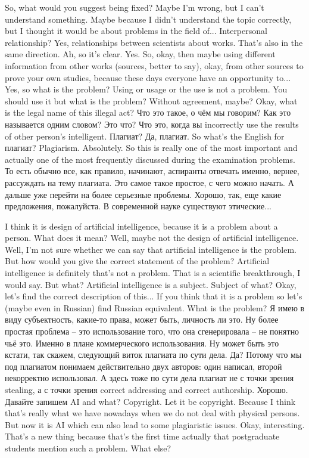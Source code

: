 \documentclass[main.tex]{subfiles}
\begin{document}
So, what would you suggest being fixed?
Maybe I'm wrong, but I can't understand something.
Maybe because I didn't understand the topic correctly, but I thought it would be about problems in the field of... Interpersonal relationship?
Yes, relationships between scientists about works.
That's also in the same direction.
Ah, so it's clear.
Yes.
So, okay, then maybe using different information from other works (sources, better to say), okay, from other sources to prove your own studies, because these days everyone have an opportunity to...
Yes, so what is the problem?
Using or usage or the use is not a problem.
You should use it but what is the problem?
Without agreement, maybe?
Okay, what is the legal name of this illegal act?
Что это такое, о чём мы говорим?
Как это называется одним словом?
Это что?
Что это, когда вы incorrectly use the results of other person's intelligent.
Плагиат?
Да, плагиат.
So what's the English for плагиат?
Plagiarism.
Absolutely.
So this is really one of the most important and actually one of the most frequently discussed during the examination problems.
То есть обычно все, как правило, начинают, аспиранты отвечать именно, вернее, рассуждать на тему плагиата.
Это самое такое простое, с чего можно начать.
А дальше уже перейти на более серьезные проблемы.
Хорошо, так, еще какие предложения, пожалуйста.
В современной науке существуют этические...

I think it is design of artificial intelligence, because it is a problem about a person.
What does it mean?
Well, maybe not the design of artificial intelligence.
Well, I'm not sure whether we can say that artificial intelligence is the problem.
But how would you give the correct statement of the problem?
Artificial intelligence is definitely that's not a problem.
That is a scientific breakthrough, I would say.
But what? 
Artificial intelligence is a subject.
Subject of what?
Okay, let's find the correct description of this...
If you think that it is a problem so let's (maybe even in Russian) find Russian equivalent.
What is the problem?
Я имею в виду субъектность, какие-то права, может быть, личность ли это.
Ну более простая проблема -- это использование того, что она сгенерировала -- не понятно чьё это.
Именно в плане коммерческого использования.
Ну может быть это кстати, так скажем, следующий виток плагиата по сути дела.
Да?
Потому что мы под плагиатом понимаем действительно двух авторов: один написал, второй некорректно использовал.
А здесь тоже по сути дела плагиат не с точки зрения stealing, а с точки зрения correct addressing and correct authorship.
Хорошо.
Давайте запишем AI and what? Copyright.
Let it be copyright.
Because I think that's really what we have nowadays when we do not deal with physical persons.
But now it is AI which can also lead to some plagiaristic issues.
Okay, interesting.
That's a new thing because that's the first time actually that postgraduate students mention such a problem.
What else?
\end{document}
